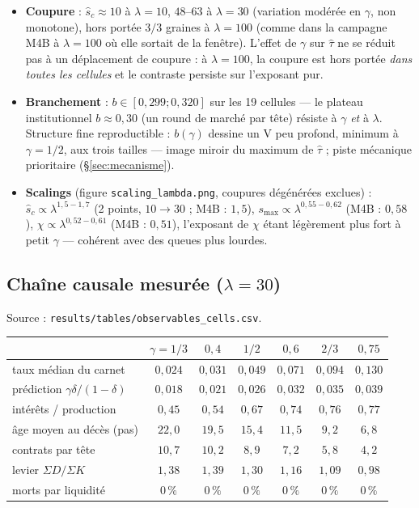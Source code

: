 \documentclass[11pt,a4paper]{article}
\newcommand{\code}[1]{\texttt{#1}}
\begin{document}
\begin{itemize}
\item \textbf{Coupure} : $\hat s_c\approx10$ à $\lambda=10$, $48$--$63$ à
$\lambda=30$ (variation modérée en $\gamma$, non monotone), hors portée
$3/3$ graines à $\lambda=100$ (comme dans la campagne M4B à $\lambda=100$
où elle sortait de la fenêtre). L'effet de $\gamma$ sur $\hat\tau$ ne se
réduit pas à un déplacement de coupure : à $\lambda=100$, la coupure est
hors portée \emph{dans toutes les cellules} et le contraste persiste sur
l'exposant pur.
\item \textbf{Branchement} : $b\in[0{,}299;0{,}320]$ sur les 19 cellules
— le plateau institutionnel $b\approx0{,}30$ (un round de marché par
tête) résiste à $\gamma$ \emph{et} à $\lambda$. Structure fine
reproductible : $b(\gamma)$ dessine un V peu profond, minimum à
$\gamma=1/2$, aux trois tailles — image miroir du maximum de
$\hat\tau$ ; piste mécanique prioritaire (\S\ref{sec:mecanisme}).
\item \textbf{Scalings} (figure \code{scaling\_lambda.png}, coupures
dégénérées exclues) : $\hat s_c\propto\lambda^{1{,}5-1{,}7}$ (2 points,
$10\to30$ ; M4B : $1{,}5$), $s_{\max}\propto\lambda^{0{,}55-0{,}62}$
(M4B : $0{,}58$), $\chi\propto\lambda^{0{,}52-0{,}61}$ (M4B : $0{,}51$),
l'exposant de $\chi$ étant légèrement plus fort à petit $\gamma$ —
cohérent avec des queues plus lourdes.
\end{itemize}

\subsection{Chaîne causale mesurée ($\lambda=30$)}
\label{sec:mecanisme-explo}

Source : \code{results/tables/observables\_cells.csv}.
\begin{center}
\begin{tabular}{lcccccc}
\toprule
& $\gamma{=}1/3$ & $0{,}4$ & $1/2$ & $0{,}6$ & $2/3$ & $0{,}75$\\
\midrule
taux médian du carnet & $0{,}024$ & $0{,}031$ & $0{,}049$ & $0{,}071$ & $0{,}094$ & $0{,}130$\\
prédiction $\gamma\delta/(1{-}\delta)$ & $0{,}018$ & $0{,}021$ & $0{,}026$ & $0{,}032$ & $0{,}035$ & $0{,}039$\\
intérêts / production & $0{,}45$ & $0{,}54$ & $0{,}67$ & $0{,}74$ & $0{,}76$ & $0{,}77$\\
âge moyen au décès (pas) & $22{,}0$ & $19{,}5$ & $15{,}4$ & $11{,}5$ & $9{,}2$ & $6{,}8$\\
contrats par tête & $10{,}7$ & $10{,}2$ & $8{,}9$ & $7{,}2$ & $5{,}8$ & $4{,}2$\\
levier $\Sigma D/\Sigma K$ & $1{,}38$ & $1{,}39$ & $1{,}30$ & $1{,}16$ & $1{,}09$ & $0{,}98$\\
morts par liquidité & $0\,\%$ & $0\,\%$ & $0\,\%$ & $0\,\%$ & $0\,\%$ & $0\,\%$\\
\bottomrule
\end{tabular}
\end{center}
\end{document}
